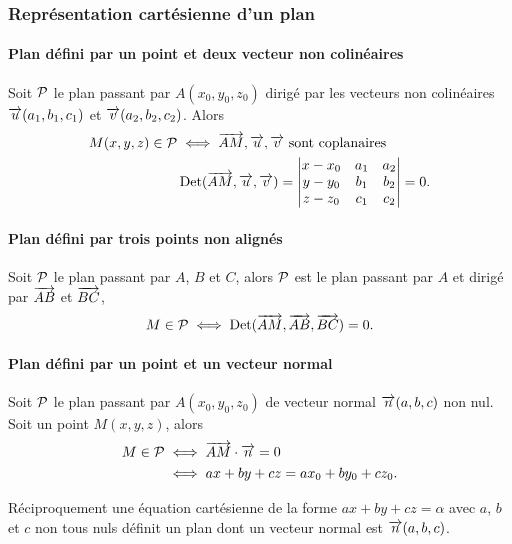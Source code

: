 \subsubsection{Représentation cartésienne d'un plan}

\paragraph{Plan défini par un point et deux vecteur non colinéaires}

Soit \(\P\) le plan passant par \(A(x_0,y_0,z_0)\) dirigé par les vecteurs non colinéaires \(\vu(a_1,b_1,c_1)\) et \(\vv(a_2,b_2,c_2)\). Alors
\begin{align}
  M(x,y,z) \in \P &\iff  \vect{AM}, \vu, \vv \text{~sont coplanaires}\\
  &\Det(\vect{AM},\vu,\vv)=\begin{vmatrix} x-x_0 & a_1 & a_2 \\ y-y_0 & b_1 & b_2 \\ z-z_0 & c_1 & c_2\end{vmatrix}=0.
\end{align}

\paragraph{Plan défini par trois points non alignés}

Soit \(\P\) le plan passant par \(A\), \(B\) et \(C\), alors \(\P\) est le plan passant par \(A\) et dirigé par \(\vect{AB}\) et \(\vect{BC}\),
\begin{equation}
  M \in \P \iff \Det(\vect{AM},\vect{AB},\vect{BC})=0.
\end{equation}

\paragraph{Plan défini par un point et un vecteur normal}

Soit \(\P\) le plan passant par \(A(x_0,y_0,z_0)\) de vecteur normal \(\vect{n}(a,b,c)\) non nul. Soit un point \(M(x,y,z)\), alors
\begin{align}
  M \in \P &\iff \vect{AM}\cdot\vect{n}=0 \\
  &\iff ax+by+cz=ax_0+by_0+cz_0.
\end{align}

Réciproquement une équation cartésienne de la forme \(ax+by+cz=\alpha\) avec \(a\), \(b\) et \(c\) non tous nuls définit un plan dont un vecteur normal est \(\vect{n}(a,b,c)\).

